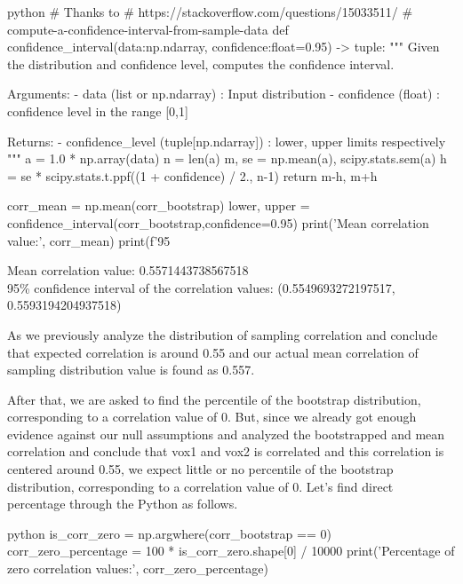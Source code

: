 \documentclass[12pt]{amsart}
\begin{document}
\begin{mintedbox}{python}
# Thanks to 
# https://stackoverflow.com/questions/15033511/
# compute-a-confidence-interval-from-sample-data
def confidence_interval(data:np.ndarray, confidence:float=0.95) -> tuple:
    """
        Given the distribution and confidence level, computes the confidence interval.
            
            Arguments:
                - data (list or np.ndarray) : Input distribution
                - confidence (float) : confidence level in the range [0,1]
            
            Returns:
                - confidence_level (tuple[np.ndarray]) : lower, upper limits respectively
    """
    a = 1.0 * np.array(data)
    n = len(a)
    m, se = np.mean(a), scipy.stats.sem(a)
    h = se * scipy.stats.t.ppf((1 + confidence) / 2., n-1)
    return m-h, m+h
    
corr_mean = np.mean(corr_bootstrap)
lower, upper = confidence_interval(corr_bootstrap,confidence=0.95)
print('Mean correlation value:', corr_mean)
print(f'95%
\end{mintedbox}

Mean correlation value: 0.5571443738567518 \\
95\% confidence interval of the correlation values: (0.5549693272197517, 0.5593194204937518)

\bigskip

As we previously analyze the distribution of sampling correlation and conclude that expected correlation is around 0.55 and our actual mean correlation of sampling distribution value is found as 0.557. 

\bigskip
After that, we are asked to find the percentile of the bootstrap distribution, corresponding to a correlation value of 0. But, since we already got enough evidence against our null assumptions and analyzed the bootstrapped and mean correlation and conclude that vox1 and vox2 is correlated and this correlation is centered around 0.55, we expect little or no percentile of the bootstrap distribution, corresponding to a correlation value of 0. Let's find direct percentage through the Python as follows.

\begin{mintedbox}{python}
is_corr_zero = np.argwhere(corr_bootstrap == 0)
corr_zero_percentage = 100 * is_corr_zero.shape[0] / 10000
print('Percentage of zero correlation values:', corr_zero_percentage)
\end{mintedbox}
\end{document}
